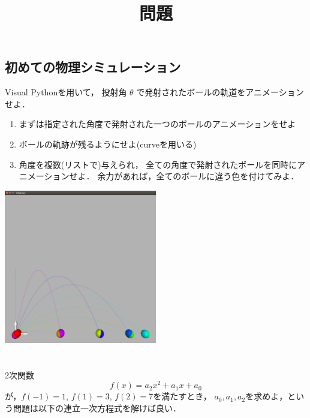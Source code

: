 \documentclass[12pt,dvipdfmx]{article}
\title{問題}
\author{}
\date{}
\begin{document}
\maketitle

\section{}

\subsection{{\scriptsize 初めての物理シミュレーション}}
Visual Pythonを用いて，
投射角 $\theta$ で発射されたボールの軌道をアニメーションせよ．

\begin{enumerate}
\item まずは指定された角度で発射された一つのボールのアニメーションをせよ
\item ボールの軌跡が残るようにせよ(curveを用いる)
\item 角度を複数(リストで)与えられ，
  全ての角度で発射されたボールを同時にアニメーションせよ．
  余力があれば，全てのボールに違う色を付けてみよ．
\end{enumerate}

\begin{center}
\includegraphics[width=0.5\textwidth]{out/pdf/img/para.pdf}
\end{center}

\newpage

\iffalse
\section{}
2次関数 
\[ f(x) = a_2 x^2 + a_1 x + a_0 \]
が，$f(-1) = 1$, $f(1) = 3$, $f(2) = 7$を満たすとき，
$a_0, a_1, a_2$を求めよ，という問題は以下の連立一次方程式を解けば良い．
\end{document}
